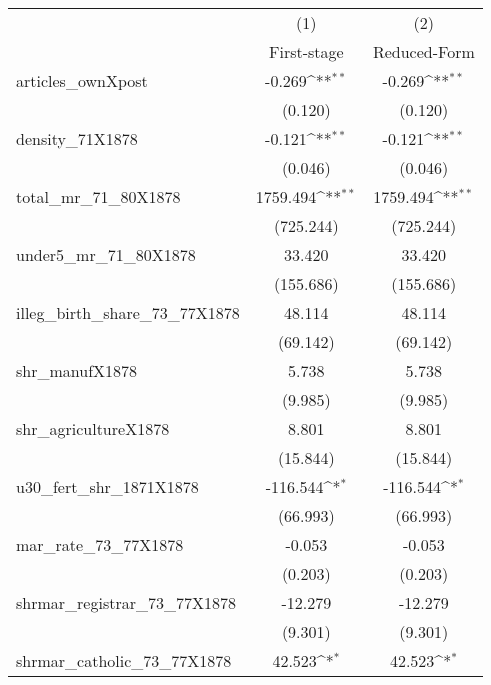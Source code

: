 {
\def\sym#1{\ifmmode^{#1}\else\(^{#1}\)\fi}
\begin{tabular}{l*{2}{c}}
\hline\hline
            &\multicolumn{1}{c}{(1)}&\multicolumn{1}{c}{(2)}\\
            &\multicolumn{1}{c}{First-stage}&\multicolumn{1}{c}{Reduced-Form}\\
\hline
articles\_ownXpost&      -0.269\sym{**} &      -0.269\sym{**} \\
            &     (0.120)         &     (0.120)         \\
[1em]
density\_71X1878&      -0.121\sym{**} &      -0.121\sym{**} \\
            &     (0.046)         &     (0.046)         \\
[1em]
total\_mr\_71\_80X1878&    1759.494\sym{**} &    1759.494\sym{**} \\
            &   (725.244)         &   (725.244)         \\
[1em]
under5\_mr\_71\_80X1878&      33.420         &      33.420         \\
            &   (155.686)         &   (155.686)         \\
[1em]
illeg\_birth\_share\_73\_77X1878&      48.114         &      48.114         \\
            &    (69.142)         &    (69.142)         \\
[1em]
shr\_manufX1878&       5.738         &       5.738         \\
            &     (9.985)         &     (9.985)         \\
[1em]
shr\_agricultureX1878&       8.801         &       8.801         \\
            &    (15.844)         &    (15.844)         \\
[1em]
u30\_fert\_shr\_1871X1878&    -116.544\sym{*}  &    -116.544\sym{*}  \\
            &    (66.993)         &    (66.993)         \\
[1em]
mar\_rate\_73\_77X1878&      -0.053         &      -0.053         \\
            &     (0.203)         &     (0.203)         \\
[1em]
shrmar\_registrar\_73\_77X1878&     -12.279         &     -12.279         \\
            &     (9.301)         &     (9.301)         \\
[1em]
shrmar\_catholic\_73\_77X1878&      42.523\sym{*}  &      42.523\sym{*}  \\

\end{tabular}}
